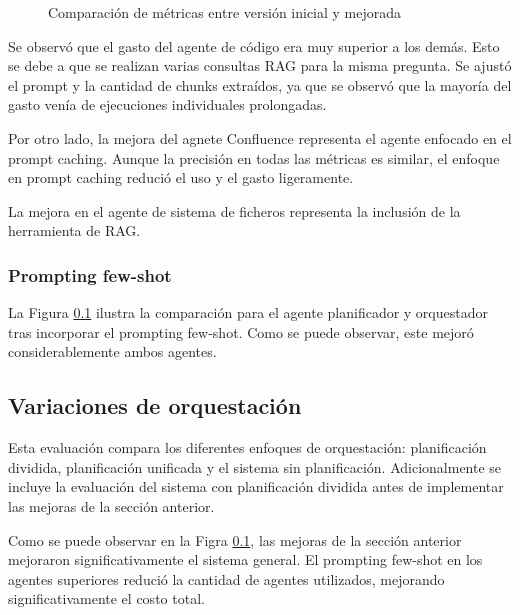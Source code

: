 \begin{figure}[hbtp]
\vspace{-0.2cm} %
\begin{center}
\end{center}

\caption{Comparación de métricas entre versión inicial y mejorada}
\label{fig:comparacion_metricas}
\end{figure}
\vspace{-0.2cm} 

Se observó que el gasto del agente de código era muy superior a los demás. Esto se debe a que se realizan varias consultas RAG para la misma pregunta. Se ajustó el prompt y la cantidad de chunks extraídos, ya que se observó que la mayoría del gasto venía de ejecuciones individuales prolongadas.

Por otro lado, la mejora del agnete Confluence representa el agente enfocado en el prompt caching. Aunque la precisión en todas las métricas es similar, el enfoque en prompt caching redució el uso y el gasto ligeramente. 

La mejora en el agente de sistema de ficheros representa la inclusión de la herramienta de RAG. 

\subsubsection{Prompting few-shot}
La Figura \ref{} ilustra la comparación para el agente planificador y orquestador tras incorporar el prompting few-shot. Como se puede observar, este mejoró considerablemente ambos agentes.

\subsection{Variaciones de orquestación}
Esta evaluación compara los diferentes enfoques de orquestación: planificación dividida, planificación unificada y el sistema sin planificación. Adicionalmente se incluye la evaluación del sistema con planificación dividida antes de implementar las mejoras de la sección anterior. 

Como se puede observar en la Figra \ref{}, las mejoras de la sección anterior mejoraron significativamente el sistema general. El prompting few-shot en los agentes superiores redució la cantidad de agentes utilizados, mejorando significativamente el costo total.

